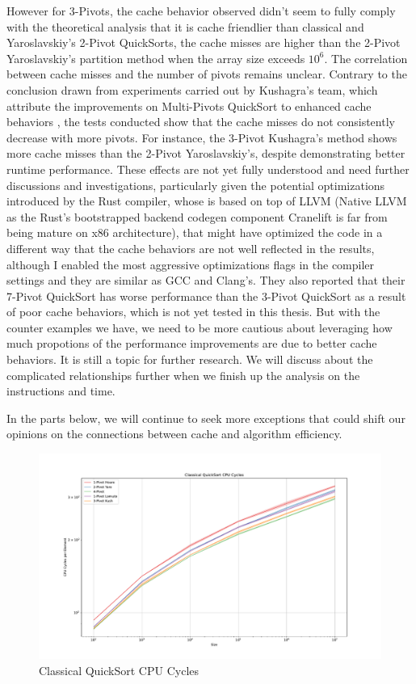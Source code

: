 \documentclass{article}
\begin{document}
However for 3-Pivots, the cache behavior observed didn't seem to fully comply with the theoretical analysis that it is cache friendlier than classical and Yaroslavskiy's 2-Pivot QuickSorts, 
the cache misses are higher than the 2-Pivot Yaroslavskiy's partition method when the array size exceeds $10^6$. The correlation between cache misses and the number of pivots remains unclear.
Contrary to the conclusion drawn from experiments carried out by Kushagra's team, which attribute the improvements on Multi-Pivots QuickSort to enhanced cache behaviors
\cite{Kushagra}, the tests conducted show that the cache misses do not consistently decrease with more pivots. For instance, the 3-Pivot Kushagra's method shows more cache misses than the 2-Pivot Yaroslavskiy's,
despite demonstrating better runtime performance. These effects are not yet fully understood and need further discussions and investigations, particularly given the potential optimizations introduced by the Rust compiler,
whose is based on top of LLVM (Native LLVM as the Rust's bootstrapped backend codegen component Cranelift is far from being mature on x86 architecture), that might have optimized the code in a different way that the cache behaviors are not well reflected in the results, although I enabled the most aggressive optimizations flags in the compiler settings
and they are similar as GCC and Clang's. They also reported that their 7-Pivot QuickSort has worse performance than the 3-Pivot QuickSort as a result of poor cache behaviors, which is not yet tested in this thesis.
But with the counter examples we have, we need to be more cautious about leveraging how much propotions of the performance improvements are due to better cache behaviors. It is still a topic for further research.
We will discuss about the complicated relationships further when we finish up the analysis on the instructions and time.

In the parts below, we will continue to seek more exceptions that could shift our opinions on the connections between cache and algorithm efficiency.

\begin{figure}[H]
    \hypertarget{fig:classicalcpucycles}{}
    \caption{Classical QuickSort CPU Cycles}
    \centering
    \hspace*{-0.27\textwidth}
    \includegraphics[width=1.5\textwidth]{Classical QuickSort CPU Cycles.pdf}
\end{figure}
\end{document}
